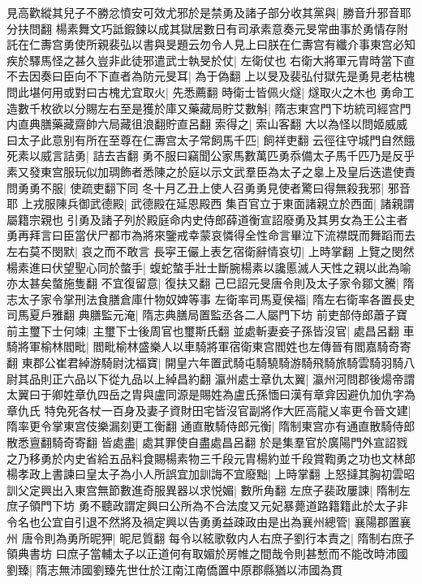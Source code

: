 見高歡縱其兒子不勝忿憤安可效尤邪於是禁勇及諸子部分收其黨與|{
	勝音升邪音耶分扶問翻}
楊素舞文巧詆鍜鍊以成其獄居數日有司承素意奏元旻常曲事於勇情存附託在仁夀宫勇使所親裴弘以書與旻題云勿令人見上曰朕在仁夀宫有纖介事東宫必知疾於驛馬怪之甚久豈非此徒邪遣武士執旻於仗|{
	左衛仗也}
右衛大將軍元胄時當下直不去因奏曰臣向不下直者為防元旻耳|{
	為于偽翻}
上以旻及裴弘付獄先是勇見老枯槐問此堪何用或對曰古槐尤宜取火|{
	先悉薦翻}
時衛士皆佩火燧|{
	燧取火之木也}
勇命工造數千枚欲以分賜左右至是獲於庫又藥藏局貯艾數斛|{
	隋志東宫門下坊統司經宫門内直典膳藥藏齋帥六局藏徂浪翻貯直呂翻}
索得之|{
	索山客翻}
大以為怪以問姬威威曰太子此意别有所在至尊在仁夀宫太子常飼馬千匹|{
	飼祥吏翻}
云徑往守城門自然餓死素以威言詰勇|{
	詰去吉翻}
勇不服曰竊聞公家馬數萬匹勇忝備太子馬千匹乃是反乎素又發東宫服玩似加琱飾者悉陳之於庭以示文武羣臣為太子之辠上及皇后迭遣使責問勇勇不服|{
	使疏吏翻下同}
冬十月乙丑上使人召勇勇見使者驚曰得無殺我邪|{
	邪音耶}
上戎服陳兵御武德殿|{
	武德殿在延恩殿西}
集百官立于東面諸親立於西面|{
	諸親謂屬籍宗親也}
引勇及諸子列於殿庭命内史侍郎薛道衡宣詔廢勇及其男女為王公主者勇再拜言曰臣當伏尸都市為將來鑒戒幸蒙哀憐得全性命言畢泣下流襟既而舞蹈而去左右莫不閔默|{
	哀之而不敢言}
長寜王儼上表乞宿衛辭情哀切|{
	上時掌翻}
上覽之閔然楊素進曰伏望聖心同於螫手|{
	蝮蛇螫手壯士斷腕楊素以讒慝滅人天性之親以此為喻亦太甚矣螫施隻翻}
不宜復留意|{
	復扶又翻}
己巳詔元旻唐令則及太子家令鄒文騰|{
	隋志太子家令掌刑法食膳倉庫什物奴婢等事}
左衛率司馬夏侯福|{
	隋左右衛率各置長史司馬夏戶雅翻}
典膳監元淹|{
	隋志典膳局置監丞各二人屬門下坊}
前吏部侍郎蕭子寶前主璽下士何竦|{
	主璽下士後周官也璽斯氏翻}
並處斬妻妾子孫皆沒官|{
	處昌呂翻}
車騎將軍榆林閻毗|{
	閻毗榆林盛樂人以車騎將軍宿衛東宫閻姓也左傳晉有閻嘉騎奇寄翻}
東郡公崔君綽游騎尉沈福寶|{
	開皇六年置武騎屯騎驍騎游騎飛騎旅騎雲騎羽騎八尉其品則正六品以下從九品以上綽昌約翻}
瀛州處士章仇太翼|{
	瀛州河問郡後煬帝謂太翼曰于卿姓章仇四岳之胄與盧同源是賜姓為盧氏孫愐曰漢有章弇因避仇加仇字為章仇氏}
特免死各杖一百身及妻子資財田宅皆沒官副將作大匠高龍乂率更令晉文建|{
	隋率更令掌東宫伎樂漏刻更工衡翻}
通直散騎侍郎元衡|{
	隋制東宫亦有通直散騎侍郎散悉亶翻騎奇寄翻}
皆處盡|{
	處其罪使自盡處昌呂翻}
於是集羣官於廣陽門外宣詔戮之乃移勇於内史省給五品料食賜楊素物三千段元胄楊約並千段賞鞫勇之功也文林郎楊孝政上書諫曰皇太子為小人所誤宜加訓誨不宜廢黜|{
	上時掌翻}
上怒撻其胸初雲昭訓父定興出入東宫無節數進奇服異器以求悦媚|{
	數所角翻}
左庶子裴政屢諫|{
	隋制左庶子領門下坊}
勇不聽政謂定興曰公所為不合法度又元妃暴薨道路籍籍此於太子非令名也公宜自引退不然將及禍定興以告勇勇益疎政由是出為襄州總管|{
	襄陽郡置襄州}
唐令則為勇所昵狎|{
	昵尼質翻}
每令以絃歌敎内人右庶子劉行本責之|{
	隋制右庶子領典書坊}
曰庶子當輔太子以正道何有取媚於房帷之間哉令則甚慙而不能改時沛國劉臻|{
	隋志無沛國劉臻先世仕於江南江南僑置中原郡縣猶以沛國為貫}
